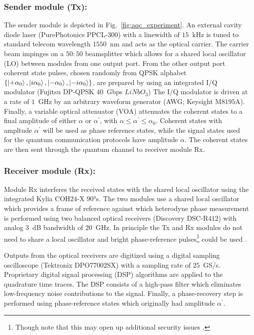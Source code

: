 \subsubsection{Sender module (Tx):} The sender module is depicted in Fig.~\ref{fig:aqc_experiment}. An external cavity diode laser (PurePhotonics PPCL-$300$) with a linewidth of $15$~kHz is tuned to standard telecom wavelength $1550$~nm and acts as the optical carrier. The carrier beam impinges on a $50:50$ beamsplitter which allows for a shared local oscillator (LO) between modules from one output port. From the other output port  coherent state pulses, chosen randomly from QPSK alphabet $\left\{ \ket{+ \alpha_0}, \ket{i \alpha_0}, \ket{-\alpha_0}, \ket{-i \alpha_0}\right\}$, are prepared by using an integrated I/Q modulator (Fujitsu DP-QPSK $40$~Gbps $LiNbO_3$) %
The I/Q modulator is driven at a rate of $1$~GHz by an arbitrary waveform generator (AWG; Keysight M$8195$A). Finally, a variable optical attenuator (VOA) attenuates the coherent states to a final amplitude of either $\alpha$ or $\alpha^\prime$, with $\alpha \le \alpha^\prime \le \alpha_0$. Coherent states with ampltude $\alpha^\prime$ will be used as phase reference states, while the signal states used for the quantum communication protocols have amplitude $\alpha$. The coherent states are then sent through the quantum channel to receiver module Rx.

\subsubsection{Receiver module (Rx):}
Module Rx interferes the received states with the shared local oscillator using the integrated Kylia COH$24$-X $90\si{\degree}$s. The two modules use a shared local oscillator which provides a frame of reference against which heterodyne phase measurement is performed using two balanced optical receivers (Discovery DSC-R$412$) with analog $3$~dB bandwidth of $20$~GHz. In principle the Tx and Rx modules do not need to share a local oscillator and bright phase-reference pulses\footnote{Though note that this may open up additional security issues \cite{Ren2019}.} could be used \cite{Huang2015}.

Outputs from the optical receivers are digitized using a digital sampling oscilloscope (Tektronix DPO$77002$SX) with a sampling rate of $25$~GS/s. Proprietary digital signal processing (DSP) algorithms are applied to the quadrature time traces. The DSP consists of a high-pass filter which eliminates low-frequency noise contributions to the signal. Finally, a phase-recovery step is performed using phase-reference states which originally had amplitude $\alpha^\prime$. %

